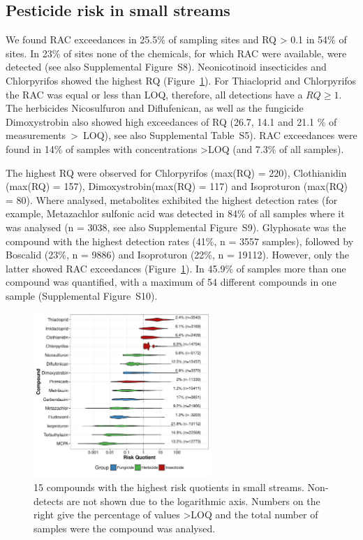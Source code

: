 \documentclass[journal=esthag,manuscript=article]{achemso}
\begin{document}
\subsection{Pesticide risk in small streams}
We found RAC exceedances in 25.5\% of sampling sites and RQ > 0.1 in 54\% of sites. 
In 23\% of sites none of the chemicals, for which RAC were available, were detected (see also Supplemental Figure~S8).
Neonicotinoid insecticides and Chlorpyrifos showed the highest RQ (Figure~\ref{fig:fig6}). %
For Thiacloprid and Chlorpyrifos the RAC was equal or less than LOQ, therefore, all detections have a $RQ \ge 1$. 
The herbicides Nicosulfuron and Diflufenican, as well as the fungicide Dimoxystrobin also showed high exceedances of RQ (26.7, 14.1 and 21.1 \% of measurements~\textgreater~LOQ), see also Supplemental Table~S5).
RAC exceedances were found in 14\% of samples with concentrations \textgreater LOQ (and 7.3\% of all samples).

The highest RQ were observed for Chlorpyrifos (max(RQ) = 220), Clothianidin (max(RQ) = 157), Dimoxystrobin(max(RQ) = 117) and Isoproturon (max(RQ) = 80). 
Where analysed, metabolites exhibited the highest detection rates (for example, Metazachlor sulfonic acid was detected in 84\% of all samples where it was analysed (n = 3038, see also Supplemental Figure~S9).
Glyphosate was the compound with the highest detection rates (41\%, n = 3557 samples), followed by Boscalid (23\%, n = 9886) and Isoproturon (22\%, n = 19112). 
However, only the latter showed RAC exceedances (Figure~\ref{fig:fig6}).
In 45.9\% of samples more than one compound was quantified, with a maximum of 54 different compounds in one sample (Supplemental Figure~S10). 

\begin{figure}[ht]
  \includegraphics[width=0.6\textwidth]{figure6.pdf}
  \caption{15 compounds with the highest risk quotients in small streams. Non-detects are not shown due to the logarithmic axis. Numbers on the right give the percentage of values \textgreater LOQ and the total number of samples were the compound was analysed.
  }
  \label{fig:fig6}
\end{figure}
\end{document}
